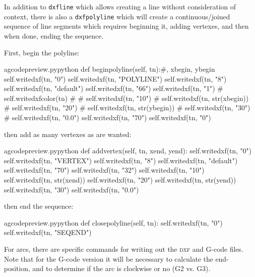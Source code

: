\documentclass{ltxdoc}
\begin{document}
In addition to \verb|dxfline| which allows creating a line without consideration of context, there is also a \verb|dxfpolyline| which will create a continuous/joined sequence of line segments which requires beginning it, adding vertexes, and then when done, ending the sequence.

First, begin the polyline:

\lstset{firstnumber=\thegcpy}
\begin{writecode}{a}{gcodepreview.py}{python}
    def beginpolyline(self, tn):#, xbegin, ybegin
        self.writedxf(tn, "0")
        self.writedxf(tn, "POLYLINE")
        self.writedxf(tn, "8")
        self.writedxf(tn, "default")
        self.writedxf(tn, "66")
        self.writedxf(tn, "1")
#
        self.writedxfcolor(tn)
#
#        self.writedxf(tn, "10")
#        self.writedxf(tn, str(xbegin))
#        self.writedxf(tn, "20")
#        self.writedxf(tn, str(ybegin))
#        self.writedxf(tn, "30")
#        self.writedxf(tn, "0.0")
        self.writedxf(tn, "70")
        self.writedxf(tn, "0")

\end{writecode}
\addtocounter{gcpy}{19}

\noindent then add as many vertexes as are wanted:

\begin{writecode}{a}{gcodepreview.py}{python}
    def addvertex(self, tn, xend, yend):
        self.writedxf(tn, "0")
        self.writedxf(tn, "VERTEX")
        self.writedxf(tn, "8")
        self.writedxf(tn, "default")
        self.writedxf(tn, "70")
        self.writedxf(tn, "32")
        self.writedxf(tn, "10")
        self.writedxf(tn, str(xend))
        self.writedxf(tn, "20")
        self.writedxf(tn, str(yend))
        self.writedxf(tn, "30")
        self.writedxf(tn, "0.0")

\end{writecode}
\addtocounter{gcpy}{14}

\noindent then end the sequence:

\begin{writecode}{a}{gcodepreview.py}{python}
    def closepolyline(self, tn):
        self.writedxf(tn, "0")
        self.writedxf(tn, "SEQEND")

\end{writecode}
\addtocounter{gcpy}{4}

For arcs, there are specific commands for writing out the \textsc{dxf} and G-code files. Note that for the G-code version it will be necessary to calculate the end-position, and to determine if the arc is clockwise or no (G2 vs. G3).
\end{document}
